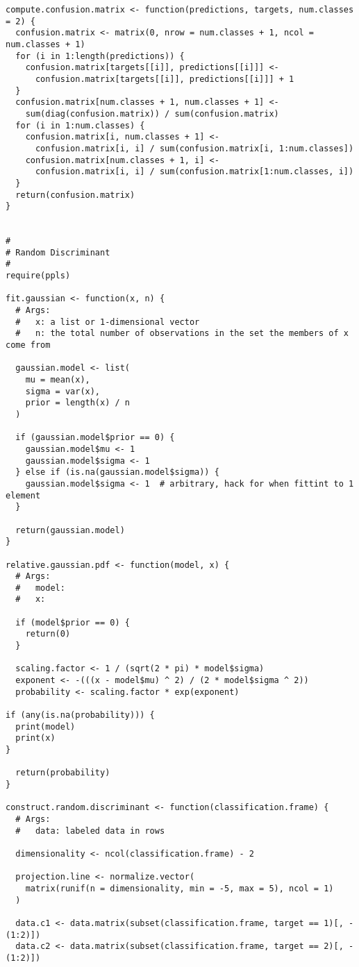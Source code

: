 \documentclass{article}
\begin{document}
\begin{verbatim}
compute.confusion.matrix <- function(predictions, targets, num.classes = 2) {
  confusion.matrix <- matrix(0, nrow = num.classes + 1, ncol = num.classes + 1)
  for (i in 1:length(predictions)) {
    confusion.matrix[targets[[i]], predictions[[i]]] <-
      confusion.matrix[targets[[i]], predictions[[i]]] + 1
  }
  confusion.matrix[num.classes + 1, num.classes + 1] <-
    sum(diag(confusion.matrix)) / sum(confusion.matrix)
  for (i in 1:num.classes) {
    confusion.matrix[i, num.classes + 1] <-
      confusion.matrix[i, i] / sum(confusion.matrix[i, 1:num.classes])
    confusion.matrix[num.classes + 1, i] <-
      confusion.matrix[i, i] / sum(confusion.matrix[1:num.classes, i])
  }
  return(confusion.matrix)
}


#
# Random Discriminant
#
require(ppls)

fit.gaussian <- function(x, n) {
  # Args:
  #   x: a list or 1-dimensional vector
  #   n: the total number of observations in the set the members of x come from

  gaussian.model <- list(
    mu = mean(x),
    sigma = var(x),
    prior = length(x) / n
  )

  if (gaussian.model$prior == 0) {
    gaussian.model$mu <- 1
    gaussian.model$sigma <- 1
  } else if (is.na(gaussian.model$sigma)) {
    gaussian.model$sigma <- 1  # arbitrary, hack for when fittint to 1 element
  }

  return(gaussian.model)
}

relative.gaussian.pdf <- function(model, x) {
  # Args:
  #   model:
  #   x:

  if (model$prior == 0) {
    return(0)
  }

  scaling.factor <- 1 / (sqrt(2 * pi) * model$sigma)
  exponent <- -(((x - model$mu) ^ 2) / (2 * model$sigma ^ 2))
  probability <- scaling.factor * exp(exponent)

if (any(is.na(probability))) {
  print(model)
  print(x)
}

  return(probability)
}

construct.random.discriminant <- function(classification.frame) {
  # Args:
  #   data: labeled data in rows

  dimensionality <- ncol(classification.frame) - 2

  projection.line <- normalize.vector(
    matrix(runif(n = dimensionality, min = -5, max = 5), ncol = 1)
  )

  data.c1 <- data.matrix(subset(classification.frame, target == 1)[, -(1:2)])
  data.c2 <- data.matrix(subset(classification.frame, target == 2)[, -(1:2)])


\end{verbatim}
\end{document}
